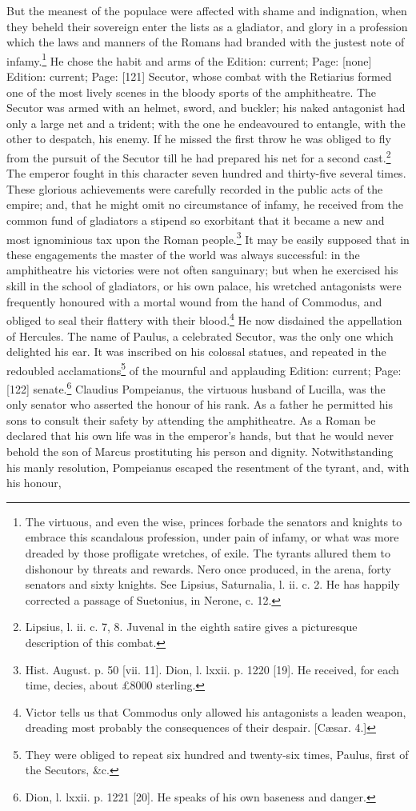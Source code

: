 But the meanest of the populace were affected with shame and indignation, when they beheld their sovereign enter the lists as a gladiator, and glory in a profession which the laws and manners of the Romans had branded with the justest note of infamy.\footnote{The virtuous, and even the wise, princes forbade the senators and knights to embrace this scandalous profession, under pain of infamy, or what was more dreaded by those profligate wretches, of exile. The tyrants allured them to dishonour by threats and rewards. Nero once produced, in the arena, forty senators and sixty knights. See Lipsius, Saturnalia, l. ii. c. 2. He has happily corrected a passage of Suetonius, in Nerone, c. 12.} He chose the habit and arms of the Edition: current; Page: [none] Edition: current; Page: [121] Secutor, whose combat with the Retiarius formed one of the most lively scenes in the bloody sports of the amphitheatre. The Secutor was armed with an helmet, sword, and buckler; his naked antagonist had only a large net and a trident; with the one he endeavoured to entangle, with the other to despatch, his enemy. If he missed the first throw he was obliged to fly from the pursuit of the Secutor till he had prepared his net for a second cast.\footnote{Lipsius, l. ii. c. 7, 8. Juvenal in the eighth satire gives a picturesque description of this combat.} The emperor fought in this character seven hundred and thirty-five several times. These glorious achievements were carefully recorded in the public acts of the empire; and, that he might omit no circumstance of infamy, he received from the common fund of gladiators a stipend so exorbitant that it became a new and most ignominious tax upon the Roman people.\footnote{Hist. August. p. 50 [vii. 11]. Dion, l. lxxii. p. 1220 [19]. He received, for each time, decies, about £8000 sterling.} It may be easily supposed that in these engagements the master of the world was always successful: in the amphitheatre his victories were not often sanguinary; but when he exercised his skill in the school of gladiators, or his own palace, his wretched antagonists were frequently honoured with a mortal wound from the hand of Commodus, and obliged to seal their flattery with their blood.\footnote{Victor tells us that Commodus only allowed his antagonists a leaden weapon, dreading most probably the consequences of their despair. [Cæsar. 4.]} He now disdained the appellation of Hercules. The name of Paulus, a celebrated Secutor, was the only one which delighted his ear. It was inscribed on his colossal statues, and repeated in the redoubled acclamations\footnote{They were obliged to repeat six hundred and twenty-six times, Paulus, first of the Secutors, \&c.} of the mournful and applauding Edition: current; Page: [122] senate.\footnote{Dion, l. lxxii. p. 1221 [20]. He speaks of his own baseness and danger.} Claudius Pompeianus, the virtuous husband of Lucilla, was the only senator who asserted the honour of his rank. As a father he permitted his sons to consult their safety by attending the amphitheatre. As a Roman be declared that his own life was in the emperor\texthebrew{}’s hands, but that he would never behold the son of Marcus prostituting his person and dignity. Notwithstanding his manly resolution, Pompeianus escaped the resentment of the tyrant, and, with his honour, 